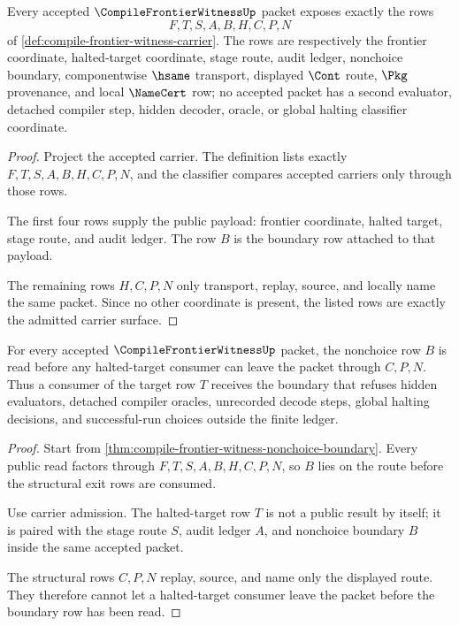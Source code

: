 \begin{theorem}
\label{thm:compile-frontier-witness-carrier-admission}
Every accepted $\CompileFrontierWitnessUp$ packet exposes exactly the rows
$$
F,T,S,A,B,H,C,P,N
$$
of \autoref{def:compile-frontier-witness-carrier}. The rows are respectively the frontier coordinate, halted-target coordinate, stage route, audit ledger, nonchoice boundary, componentwise $\hsame$ transport, displayed $\Cont$ route, $\Pkg$ provenance, and local $\NameCert$ row; no accepted packet has a second evaluator, detached compiler step, hidden decoder, oracle, or global halting classifier coordinate.
\end{theorem}
\begin{proof}
Project the accepted carrier. The definition lists exactly $F,T,S,A,B,H,C,P,N$, and the classifier compares accepted carriers only through those rows.

The first four rows supply the public payload: frontier coordinate, halted target, stage route, and audit ledger. The row $B$ is the boundary row attached to that payload.

The remaining rows $H,C,P,N$ only transport, replay, source, and locally name the same packet. Since no other coordinate is present, the listed rows are exactly the admitted carrier surface.
\end{proof}

\begin{theorem}
\label{thm:compile-frontier-witness-boundary-exactness}
For every accepted $\CompileFrontierWitnessUp$ packet, the nonchoice row $B$ is read before any halted-target consumer can leave the packet through $C,P,N$. Thus a consumer of the target row $T$ receives the boundary that refuses hidden evaluators, detached compiler oracles, unrecorded decode steps, global halting decisions, and successful-run choices outside the finite ledger.
\end{theorem}
\begin{proof}
Start from \autoref{thm:compile-frontier-witness-nonchoice-boundary}. Every public read factors through $F,T,S,A,B,H,C,P,N$, so $B$ lies on the route before the structural exit rows are consumed.

Use carrier admission. The halted-target row $T$ is not a public result by itself; it is paired with the stage route $S$, audit ledger $A$, and nonchoice boundary $B$ inside the same accepted packet.

The structural rows $C,P,N$ replay, source, and name only the displayed route. They therefore cannot let a halted-target consumer leave the packet before the boundary row has been read.
\end{proof}

